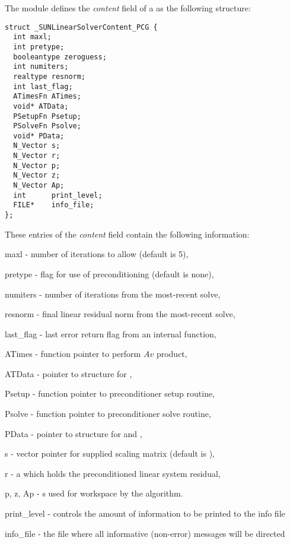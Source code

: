 The {\sunlinsolpcg} module defines the \textit{content} field of a
 as the following structure:
\begin{verbatim}
struct _SUNLinearSolverContent_PCG {
  int maxl;
  int pretype;
  booleantype zeroguess;
  int numiters;
  realtype resnorm;
  int last_flag;
  ATimesFn ATimes;
  void* ATData;
  PSetupFn Psetup;
  PSolveFn Psolve;
  void* PData;
  N_Vector s;
  N_Vector r;
  N_Vector p;
  N_Vector z;
  N_Vector Ap;
  int      print_level;
  FILE*    info_file;
};
\end{verbatim}
These entries of the \emph{content} field contain the following
information:
\begin{args}
  \item[maxl] - number of {\pcg} iterations to allow (default is 5),
  \item[pretype] - flag for use of preconditioning (default is none),
  \item[numiters] - number of iterations from the most-recent solve,
  \item[resnorm] - final linear residual norm from the most-recent solve,
  \item[last\_flag] - last error return flag from an internal function,
  \item[ATimes] - function pointer to perform $Av$ product,
  \item[ATData] - pointer to structure for ,
  \item[Psetup] - function pointer to preconditioner setup routine,
  \item[Psolve] - function pointer to preconditioner solve routine,
  \item[PData] - pointer to structure for  and ,
  \item[s] - vector pointer for supplied scaling matrix
    (default is ),
  \item[r] - a {\nvector} which holds the preconditioned linear system
    residual,
  \item[p, z, Ap] - {\nvector}s used for workspace by the
    {\pcg} algorithm.
  \item[print\_level] - controls the amount of information to be printed to the info file
  \item[info\_file]   - the file where all informative (non-error) messages will be directed
\end{args}
